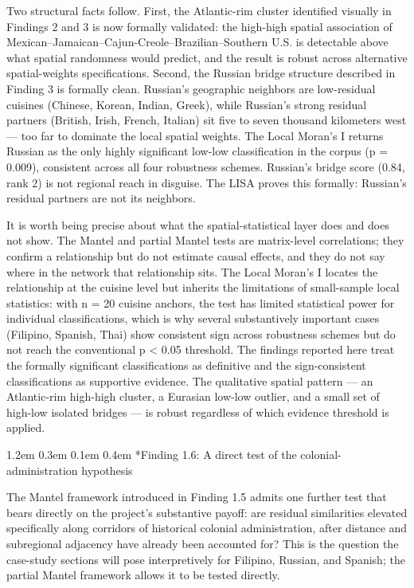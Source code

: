 \documentclass[11pt]{article}
\makeatletter
\renewcommand\subsection{\@startsection{subsection}{2}{\z@}%
  {1.2em \@plus 0.3em \@minus 0.1em}%
  {0.4em}%
  {\normalfont\large\bfseries\itshape\color{black!75}}}
\makeatother
\begin{document}
Two structural facts follow. First, the Atlantic-rim cluster identified visually in Findings 2 and 3 is now formally validated: the high-high spatial association of Mexican–Jamaican–Cajun-Creole–Brazilian–Southern U.S. is detectable above what spatial randomness would predict, and the result is robust across alternative spatial-weights specifications. Second, the Russian bridge structure described in Finding 3 is formally clean. Russian's geographic neighbors are low-residual cuisines (Chinese, Korean, Indian, Greek), while Russian's strong residual partners (British, Irish, French, Italian) sit five to seven thousand kilometers west — too far to dominate the local spatial weights. The Local Moran's I returns Russian as the only highly significant low-low classification in the corpus (p = 0.009), consistent across all four robustness schemes. Russian's bridge score (0.84, rank 2) is not regional reach in disguise. The LISA proves this formally: Russian's residual partners are not its neighbors.


It is worth being precise about what the spatial-statistical layer does and does not show. The Mantel and partial Mantel tests are matrix-level correlations; they confirm a relationship but do not estimate causal effects, and they do not say where in the network that relationship sits. The Local Moran's I locates the relationship at the cuisine level but inherits the limitations of small-sample local statistics: with n = 20 cuisine anchors, the test has limited statistical power for individual classifications, which is why several substantively important cases (Filipino, Spanish, Thai) show consistent sign across robustness schemes but do not reach the conventional p < 0.05 threshold. The findings reported here treat the formally significant classifications as definitive and the sign-consistent classifications as supportive evidence. The qualitative spatial pattern — an Atlantic-rim high-high cluster, a Eurasian low-low outlier, and a small set of high-low isolated bridges — is robust regardless of which evidence threshold is applied.


\subsection*{Finding 1.6: A direct test of the colonial-administration hypothesis}


The Mantel framework introduced in Finding 1.5 admits one further test that bears directly on the project's substantive payoff: are residual similarities elevated specifically along corridors of historical colonial administration, after distance and subregional adjacency have already been accounted for? This is the question the case-study sections will pose interpretively for Filipino, Russian, and Spanish; the partial Mantel framework allows it to be tested directly.
\end{document}
